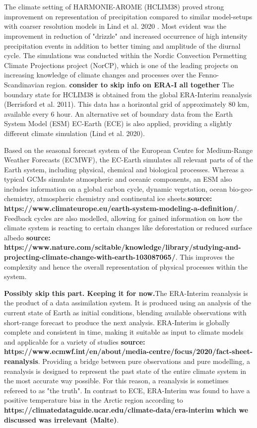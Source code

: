 \\
\\
The climate setting of HARMONIE-AROME (HCLIM38) proved strong improvement on representation of precipitation compared to similar model-setups with coarser resolution models in Lind et al. 2020 \cite{lind_arome}. Most evident was the improvement in reduction of "drizzle" and increased occurrence of high intensity precipitation events in addition to better timing and amplitude of the diurnal cycle. The simulations was conducted within the Nordic Convection Permetting Climate Projections project (NorCP), which is one of the leading projects on increasing knowledge of climate changes and processes over the Fenno-Scandinavian region. \textbf{consider to skip info on ERA-I all together} The boundary state for HCLIM38 is obtained from the global ERA-Interim reanalysis (Berrisford et al. 2011)\cite{erai}. This data has a horizontal grid of approximately 80 km, available every 6 hour. An alternative set of boundary data from the Earth System Model (ESM) EC-Earth (ECE) is also applied, providing a slightly different climate simulation (Lind et al. 2020)\cite{lind_arome}.    

Based on the seasonal forecast system of the European Centre for Medium-Range Weather Forecasts (ECMWF), the EC-Earth simulates all relevant parts of of the Earth system, including physical, chemical and biological processes. Whereas a typical GCMs simulate atmospheric and oceanic components, an ESM also includes information on a global carbon cycle, dynamic vegetation, ocean bio-geo-chemistry, atmospheric chemistry and continental ice sheets.\textbf{source: https://www.climateurope.eu/earth-system-modeling-a-definition/}. Feedback cycles are also modelled, allowing for gained information on how the climate system is reacting to certain changes like deforestation or reduced surface albedo \textbf{source: https://www.nature.com/scitable/knowledge/library/studying-and-projecting-climate-change-with-earth-103087065/}. This improves the complexity and hence the overall representation of physical processes within the system.

\textbf{Possibly skip this part. Keeping it for now.}The ERA-Interim reanalysis is the product of a data assimilation system. It is produced using an analysis of the current state of Earth as initial conditions, blending available observations with short-range forecast to produce the next analysis. ERA-Interim is globally complete and consistent in time, making it suitable as input to climate models and applicable for a variety of studies \textbf{source: https://www.ecmwf.int/en/about/media-centre/focus/2020/fact-sheet-reanalysis}. Providing a bridge between pure observations and pure modelling, a reanalysis is designed to represent the past state of the entire climate system in the most accurate way possible. For this reason, a reanalysis is sometimes refereed to as "the truth". In contrast to ECE, ERA-Interim was found to have a positive temperature bias in the Arctic region according to \textbf{https://climatedataguide.ucar.edu/climate-data/era-interim} \textbf{which we discussed was irrelevant (Malte)}.  


